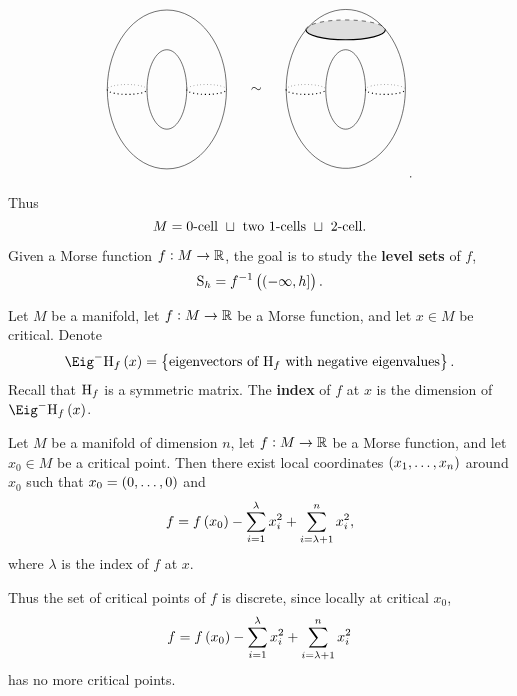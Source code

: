\begin{example}
\begin{itemize}
$$\begin{tikzpicture}
\draw (0, 0) ellipse (1.5 and 2);
\draw (0, 0) ellipse (0.5 and 1);
\draw [dotted, thick] (-1.5, 0) arc (-180:0:0.5 and 0.125);
\draw [dotted, thick] (0.5, 0) arc (-180:0:0.5 and 0.125);
\draw [dotted] (-0.5, 0) arc (0:180:0.5 and 0.125);
\draw [dotted] (1.5, 0) arc (0:180:0.5 and 0.125);
\draw (2.25, 0) node{$ \sim $};
\draw (3.5, 1.5) arc (-228:48:1.5 and 2);
\draw (4.5, 0) ellipse (0.5 and 1);
\fill [lightgray, opacity=0.5] (4.5, 1.5) ellipse (1 and 0.25);
\draw [dotted, thick] (3, 0) arc (-180:0:0.5 and 0.125);
\draw [dotted, thick] (5, 0) arc (-180:0:0.5 and 0.125);
\draw [dotted] (3, 0) arc (180:0:0.5 and 0.125);
\draw [dotted] (5, 0) arc (180:0:0.5 and 0.125);
\draw [dashed] (3.5, 1.5) arc (180:0:1 and 0.25);
\draw [thick] (3.5, 1.5) arc (-180:0:1 and 0.25);
\draw (3.5, 1.5) arc (132:48:1.5 and 2);
\end{tikzpicture}.
$$
\end{itemize}
Thus
$$ M = \text{$ 0 $-cell} \ \sqcup \ \text{two $ 1 $-cells} \ \sqcup \ \text{$ 2 $-cell}. $$
\end{example}

Given a Morse function $ f : M \to \mathbb{R} $, the goal is to study the \textbf{level sets} of $ f $,
$$ \S_h = f^{-1}\br{\intoc{-\infty, h}}. $$

\begin{definition}
Let $ M $ be a manifold, let $ f : M \to \mathbb{R} $ be a Morse function, and let $ x \in M $ be critical. Denote
$$ \Eig^- \H_f\br{x} = \cbr{\text{eigenvectors of} \ \H_f \ \text{with negative eigenvalues}}. $$
Recall that $ \mathrm{H}_f $ is a symmetric matrix. The \textbf{index} of $ f $ at $ x $ is the dimension of $ \Eig^- \H_f\br{x} $.
\end{definition}

\pagebreak

\begin{lemma}[Morse]
Let $ M $ be a manifold of dimension $ n $, let $ f : M \to \mathbb{R} $ be a Morse function, and let $ x_0 \in M $ be a critical point. Then there exist local coordinates $ \br{x_1, \dots, x_n} $ around $ x_0 $ such that $ x_0 = \br{0, \dots, 0} $ and
$$ f = f\br{x_0} - \sum_{i = 1}^\lambda x_i^2 + \sum_{i = \lambda + 1}^n x_i^2, $$
where $ \lambda $ is the index of $ f $ at $ x $.
\end{lemma}

Thus the set of critical points of $ f $ is discrete, since locally at critical $ x_0 $,
$$ f = f\br{x_0} - \sum_{i = 1}^\lambda x_i^2 + \sum_{i = \lambda + 1}^n x_i^2 $$
has no more critical points.

